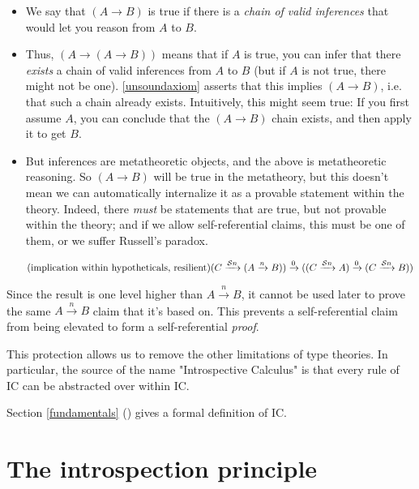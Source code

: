 \documentclass{article}
\begin{document}
  \begin{itemize}
    \item We say that $(A \to B)$ is true if there is a \emph{chain of valid inferences} that would let you reason from $A$ to $B$.
    \item Thus, $(A \to (A \to B))$ means that if $A$ is true, you can infer that there \emph{exists} a chain of valid inferences from $A$ to $B$ (but if $A$ is not true, there might not be one). \eqref{unsoundaxiom} asserts that this implies $(A \to B)$, i.e. that such a chain already exists. Intuitively, this might seem true: If you first assume $A$, you can conclude that the $(A \to B)$ chain exists, and then apply it to get $B$.
    \item But inferences are metatheoretic objects, and the above is metatheoretic reasoning. So $(A \to B)$ will be true in the metatheory, but this doesn't mean we can automatically internalize it as a provable statement within the theory. Indeed, there \emph{must} be statements that are true, but not provable within the theory; and if we allow self-referential claims, this must be one of them, or we suffer Russell's paradox.
  \end{itemize}

  
  
    \renewcommand{\implies}[1]{\xrightarrow{#1}}
  \newcommand{\lzero}{0}
  \newcommand{\lsucc}[1]{\mathcal{S} #1}
  \begin{equation*}
    \tag{implication within hypotheticals, resilient}
    (C \implies{\lsucc n} (A \implies{n} B)) \implies{\lzero} ((C \implies{\lsucc n} A) \implies{\lzero} (C \implies{\lsucc n} B))
    \vspace{0.8em}
  \end{equation*}
  
  Since the result is one level higher than $A \implies{n} B$, it cannot be used later to prove the same $A \implies{n} B$ claim that it's based on. This prevents a self-referential claim from being elevated to form a self-referential \emph{proof}.
  
  This protection allows us to remove the other limitations of type theories.
  In particular, the source of the name "Introspective Calculus" is that every rule of IC can be abstracted over within IC.



  
  Section \ref{fundamentals} (\textit{}) gives a formal definition of IC.   \fi
   
  \section{The introspection principle}\label{firststeps}
  
\end{document}
